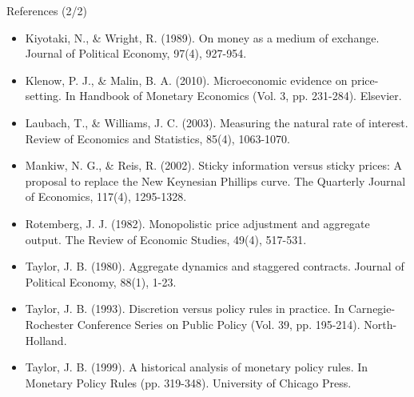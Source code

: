 \documentclass[10pt,c,aspectratio=1610,handout]{beamer}
\begin{document}
\begin{frame}{References (2/2)}%
  \begin{scriptsize}%
    \begin{itemize}%
      \item[$\blacktriangleright$] Kiyotaki, N., \& Wright, R. (1989). On money as a medium of exchange. Journal of Political Economy, 97(4), 927-954.%
      \item[$\blacktriangleright$] Klenow, P. J., \& Malin, B. A. (2010). Microeconomic evidence on price-setting. In Handbook of Monetary Economics (Vol. 3, pp. 231-284). Elsevier.%
      \item[$\blacktriangleright$] Laubach, T., \& Williams, J. C. (2003). Measuring the natural rate of interest. Review of Economics and Statistics, 85(4), 1063-1070.%
      \item[$\blacktriangleright$] Mankiw, N. G., \& Reis, R. (2002). Sticky information versus sticky prices: A proposal to replace the New Keynesian Phillips curve. The Quarterly Journal of Economics, 117(4), 1295-1328.%
      \item[$\blacktriangleright$] Rotemberg, J. J. (1982). Monopolistic price adjustment and aggregate output. The Review of Economic Studies, 49(4), 517-531.%
      \item[$\blacktriangleright$] Taylor, J. B. (1980). Aggregate dynamics and staggered contracts. Journal of Political Economy, 88(1), 1-23.%
      \item[$\blacktriangleright$] Taylor, J. B. (1993). Discretion versus policy rules in practice. In Carnegie-Rochester Conference Series on Public Policy (Vol. 39, pp. 195-214). North-Holland.%
      \item[$\blacktriangleright$] Taylor, J. B. (1999). A historical analysis of monetary policy rules. In Monetary Policy Rules (pp. 319-348). University of Chicago Press.%
    \end{itemize}%
  \end{scriptsize}%
\end{frame}%
\end{document}
